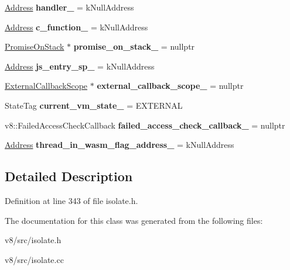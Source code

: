 \begin{DoxyCompactItemize}
\mbox{\label{classv8_1_1internal_1_1ThreadLocalTop_a4efce7d729073dfb73f0bc6c3fdc54cf}} 
\mbox{\hyperlink{classuintptr__t}{Address}} {\bfseries handler\+\_\+} = k\+Null\+Address
\item 
\mbox{\label{classv8_1_1internal_1_1ThreadLocalTop_a69e360da2917b948c2b75773722c2238}} 
\mbox{\hyperlink{classuintptr__t}{Address}} {\bfseries c\+\_\+function\+\_\+} = k\+Null\+Address
\item 
\mbox{\label{classv8_1_1internal_1_1ThreadLocalTop_ac2f5b14a0ca8839224180f8b6c1acce6}} 
\mbox{\hyperlink{classv8_1_1internal_1_1PromiseOnStack}{Promise\+On\+Stack}} $\ast$ {\bfseries promise\+\_\+on\+\_\+stack\+\_\+} = nullptr
\item 
\mbox{\label{classv8_1_1internal_1_1ThreadLocalTop_a2a93253ede9a9c1687f5aba5107da7b7}} 
\mbox{\hyperlink{classuintptr__t}{Address}} {\bfseries js\+\_\+entry\+\_\+sp\+\_\+} = k\+Null\+Address
\item 
\mbox{\label{classv8_1_1internal_1_1ThreadLocalTop_a440206c169aa838a504161a59ec018c8}} 
\mbox{\hyperlink{classv8_1_1internal_1_1ExternalCallbackScope}{External\+Callback\+Scope}} $\ast$ {\bfseries external\+\_\+callback\+\_\+scope\+\_\+} = nullptr
\item 
\mbox{\label{classv8_1_1internal_1_1ThreadLocalTop_ab4603fb29594e25660ca3b25bc9be4fc}} 
State\+Tag {\bfseries current\+\_\+vm\+\_\+state\+\_\+} = E\+X\+T\+E\+R\+N\+AL
\item 
\mbox{\label{classv8_1_1internal_1_1ThreadLocalTop_aaf6d18342d06ea6c3dd5e110f9a5f3e1}} 
v8\+::\+Failed\+Access\+Check\+Callback {\bfseries failed\+\_\+access\+\_\+check\+\_\+callback\+\_\+} = nullptr
\item 
\mbox{\label{classv8_1_1internal_1_1ThreadLocalTop_acf5f50f8f2a4ca6efc85b6fb94c370bd}} 
\mbox{\hyperlink{classuintptr__t}{Address}} {\bfseries thread\+\_\+in\+\_\+wasm\+\_\+flag\+\_\+address\+\_\+} = k\+Null\+Address
\end{DoxyCompactItemize}


\subsection{Detailed Description}


Definition at line 343 of file isolate.\+h.



The documentation for this class was generated from the following files\+:\begin{DoxyCompactItemize}
\item 
v8/src/isolate.\+h\item 
v8/src/isolate.\+cc\end{DoxyCompactItemize}
